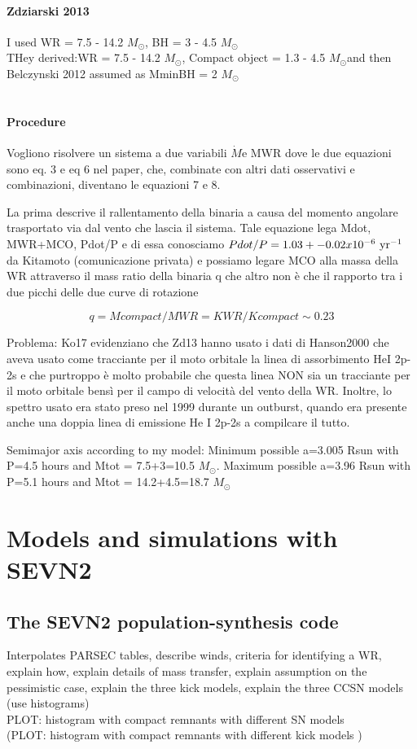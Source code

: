 \documentclass[a4paper,titlepage]{book}     	%
\newcommand{\sun}{\ensuremath{_\odot}}
\newcommand{\mdot}{\ensuremath{\dot{M}}}
\newcommand{\msun}{\ensuremath{M\sun}}
\begin{document}
\subsubsection{Zdziarski 2013} \cite{Cyg-X3_Zd2013} I used WR = 7.5 - 14.2 \msun, BH = 3 - 4.5 \msun \\

THey derived:WR = 7.5 - 14.2 \msun, Compact object = 1.3 - 4.5 \msun and then Belczynski 2012 assumed as MminBH = 2 \msun\\
\\

\subsubsection{Procedure}
Vogliono risolvere un sistema a due variabili \mdot e MWR dove le due equazioni sono eq. 3 e eq 6 nel paper, che, combinate con altri dati osservativi e combinazioni, diventano le equazioni 7 e 8.

La prima descrive il rallentamento della binaria a causa del momento angolare trasportato via dal vento che lascia il sistema. Tale equazione lega Mdot, MWR+MCO, Pdot/P e di essa conosciamo $Pdot/P = 1.03+- 0.02 x 10^{-6} ~ \rm yr^{-1}$ da Kitamoto (comunicazione privata) e possiamo legare MCO alla massa della WR attraverso il mass ratio della binaria q che altro non è che il rapporto tra i due picchi delle due curve di rotazione

\[q = Mcompact/MWR = KWR / Kcompact \sim 0.23\] 

Problema: Ko17 evidenziano che Zd13 hanno usato i dati di Hanson2000 che aveva usato come tracciante per il moto orbitale la linea di assorbimento HeI 2p-2s e che purtroppo è molto probabile che questa linea NON sia un tracciante per il moto orbitale bensì per il campo di velocità del vento della WR. Inoltre, lo spettro usato era stato preso nel 1999 durante un outburst, quando era presente anche una doppia linea di emissione He I 2p-2s a compilcare il tutto. 




Semimajor axis according to my model: Minimum possible a=3.005 Rsun with P=4.5 hours and Mtot = 7.5+3=10.5 \msun .  Maximum possible a=3.96 Rsun with P=5.1 hours and Mtot = 14.2+4.5=18.7 \msun 


\chapter{Models and simulations with SEVN2}
\section{The SEVN2 population-synthesis code}
Interpolates PARSEC tables, describe winds, criteria for identifying a WR, explain how, explain details of mass transfer, explain assumption on the pessimistic case, explain the three kick models, explain the three CCSN models (use histograms)\\
PLOT: histogram with compact remnants with different SN models\\
(PLOT: histogram with compact remnants with different kick models )
\end{document}
